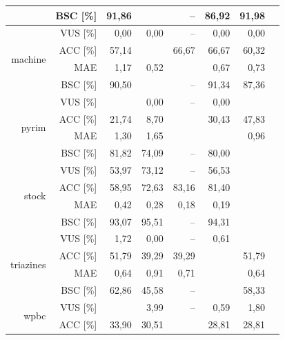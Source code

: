 \documentclass{mini}
\begin{document}
\begin{table}[!htbp]
\begin{tabular}{rrrrrrrr}
   & BSC [\%] & 91,86 & \color{red}{92,25} & -- & 86,92 & 91,98 &\color{gray}{51,15}\\ 
   \hline
\multirow{4}{15mm}{machine} & VUS [\%] & 0,00 & 0,00 & -- & 0,00 & 0,00 &\color{gray}{0,00}\\ 
   & ACC [\%] & 57,14 & \color{red}{68,25} & 66,67 & 66,67 & 60,32 &\color{gray}{69,84}\\ 
   & MAE \color{white}{[\%]} & 1,17 & 0,52 & \color{red}{0,51} & 0,67 & 0,73 &\color{gray}{0,48}\\ 
   & BSC [\%] & 90,50 & \color{red}{92,87} & -- & 91,34 & 87,36 &\color{gray}{29,20}\\ 
   \hline
\multirow{4}{15mm}{pyrim} & VUS [\%] & \color{red}{0,74} & 0,00 & -- & 0,00 & \color{red}{0,74} &\color{gray}{0,00}\\ 
   & ACC [\%] & 21,74 & 8,70 & \color{red}{52,17} & 30,43 & 47,83 &\color{gray}{47,83}\\ 
   & MAE \color{white}{[\%]} & 1,30 & 1,65 & \color{red}{0,91} & \color{red}{0,91} & 0,96 &\color{gray}{0,87}\\ 
   & BSC [\%] & 81,82 & 74,09 & -- & 80,00 & \color{red}{82,73} &\color{gray}{61,82}\\ 
   \hline
\multirow{4}{15mm}{stock} & VUS [\%] & 53,97 & 73,12 & -- & 56,53 & \color{red}{96,01} &\color{gray}{0,01}\\ 
   & ACC [\%] & 58,95 & 72,63 & 83,16 & 81,40 & \color{red}{91,58} &\color{gray}{86,67}\\ 
   & MAE \color{white}{[\%]} & 0,42 & 0,28 & 0,18 & 0,19 & \color{red}{0,08} &\color{gray}{0,14}\\ 
   & BSC [\%] & 93,07 & 95,51 & -- & 94,31 & \color{red}{99,42} &\color{gray}{50,69}\\ 
   \hline
\multirow{4}{15mm}{triazines} & VUS [\%] & 1,72 & 0,00 & -- & 0,61 & \color{red}{1,83}&\color{gray}{0,00} \\ 
   & ACC [\%] & 51,79 & 39,29 & 39,29 & \color{red}{53,57} & 51,79 &\color{gray}{44,64}\\ 
   & MAE \color{white}{[\%]} & 0,64 & 0,91 & 0,71 & \color{red}{0,61} & 0,64 &\color{gray}{0,88}\\ 
   & BSC [\%] & 62,86 & 45,58 & -- & \color{red}{66,46} & 58,33 &\color{gray}{42,49}\\ 
   \hline
\multirow{4}{15mm}{wpbc} & VUS [\%] & \color{red}{4,44} & 3,99 & -- & 0,59 & 1,80 &\color{gray}{0,00}\\ 
   & ACC [\%] & 33,90 & 30,51 & \color{red}{35,59} & 28,81 & 28,81 &\color{gray}{25,42}\\ 

\end{tabular}
\end{table}
\end{document}
